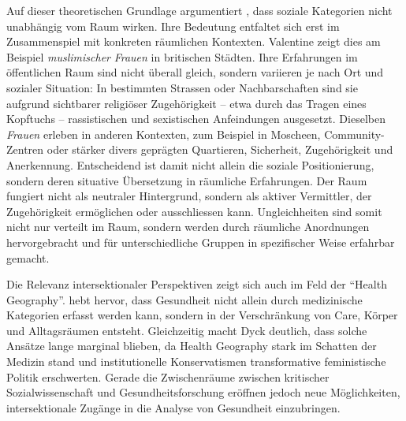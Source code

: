Auf dieser theoretischen Grundlage argumentiert \textcite{valentineTheorizingResearchingIntersectionality2007}, dass soziale Kategorien nicht unabhängig vom Raum wirken. Ihre Bedeutung entfaltet sich erst im Zusammenspiel mit konkreten räumlichen Kontexten. Valentine zeigt dies am Beispiel \emph{muslimischer} \emph{Frauen} in britischen Städten. Ihre Erfahrungen im öffentlichen Raum sind nicht überall gleich, sondern variieren je nach Ort und sozialer Situation: In bestimmten Strassen oder Nachbarschaften sind sie aufgrund sichtbarer religiöser Zugehörigkeit -- etwa durch das Tragen eines Kopftuchs -- rassistischen und sexistischen Anfeindungen ausgesetzt. Dieselben \emph{Frauen} erleben in anderen Kontexten, zum Beispiel in Moscheen, Community-Zentren oder stärker divers geprägten Quartieren, Sicherheit, Zugehörigkeit und Anerkennung. Entscheidend ist damit nicht allein die soziale Positionierung, sondern deren situative Übersetzung in räumliche Erfahrungen. Der Raum fungiert nicht als neutraler Hintergrund, sondern als aktiver Vermittler, der Zugehörigkeit ermöglichen oder ausschliessen kann. Ungleichheiten sind somit nicht nur verteilt im Raum, sondern werden durch räumliche Anordnungen hervorgebracht und für unterschiedliche Gruppen in spezifischer Weise erfahrbar gemacht.

Die Relevanz intersektionaler Perspektiven zeigt sich auch im Feld der \enquote{Health Geography}. \textcite{dyckFeminismHealthGeography2003} hebt hervor, dass Gesundheit nicht allein durch medizinische Kategorien erfasst werden kann, sondern in der Verschränkung von Care, Körper und Alltagsräumen entsteht. Gleichzeitig macht Dyck deutlich, dass solche Ansätze lange marginal blieben, da Health Geography stark im Schatten der Medizin stand und institutionelle Konservatismen transformative feministische Politik erschwerten. Gerade die Zwischenräume zwischen kritischer Sozialwissenschaft und Gesundheitsforschung eröffnen jedoch neue Möglichkeiten, intersektionale Zugänge in die Analyse von Gesundheit einzubringen. 

